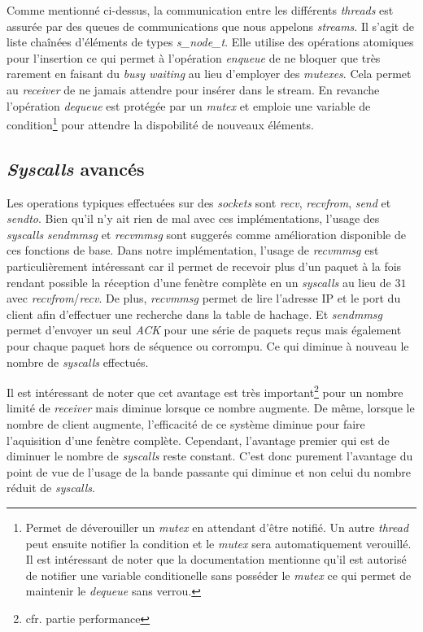 \documentclass[../main.tex]{subfiles}
\begin{document}
Comme mentionné ci-dessus, la communication entre les différents \textit{threads} est assurée par des queues de communications que nous appelons \textit{streams}.
Il s'agit de liste chaînées d'éléments de types \textit{s\_node\_t}. Elle utilise des opérations atomiques pour l'insertion ce qui permet
à l'opération \textit{enqueue} de ne bloquer que très rarement en faisant du \textit{busy waiting} au lieu d'employer des \textit{mutexes}. Cela permet
au \textit{receiver} de ne jamais attendre pour insérer dans le stream. En revanche l'opération \textit{dequeue} est protégée par un \textit{mutex} et
emploie une variable de condition\footnote{ Permet de déverouiller un \textit{mutex} en attendant d'être notifié. Un autre \textit{thread} peut ensuite notifier
la condition et le \textit{mutex} sera automatiquement verouillé. Il est intéressant de noter que la documentation mentionne qu'il est autorisé
de notifier une variable conditionelle sans posséder le \textit{mutex} ce qui permet de maintenir le \textit{dequeue} sans verrou. } pour attendre la dispobilité de nouveaux éléments.

\subsection{\textit{Syscalls} avancés}
\label{sec:syscalls}

Les operations typiques effectuées sur des \textit{sockets} sont \textit{recv}, \textit{recvfrom}, \textit{send} et \textit{sendto}. Bien qu'il n'y ait rien
de mal avec ces implémentations, l'usage des \textit{syscalls} \textit{sendmmsg} et \textit{recvmmsg} sont suggerés comme amélioration disponible\cite{that_awesome_paper}
de ces fonctions de base. Dans notre implémentation, l'usage de \textit{recvmmsg} est particulièrement intéressant car il permet de recevoir plus d'un paquet à la fois
rendant possible la réception d'une fenètre complète en un \textit{syscalls} au lieu de $31$ avec \textit{recvfrom}/\textit{recv}. De plus, \textit{recvmmsg} permet
de lire l'adresse IP et le port du client afin d'effectuer une recherche dans la table de hachage. Et \textit{sendmmsg} permet d'envoyer un seul \textit{ACK} pour
une série de paquets reçus mais également pour chaque paquet hors de séquence ou corrompu. Ce qui diminue à nouveau le nombre de \textit{syscalls} effectués.

Il est intéressant de noter que cet avantage est très important\footnote{ cfr. partie performance} pour un nombre limité de \textit{receiver} mais diminue lorsque 
ce nombre augmente. De même, lorsque le nombre de client augmente, l'efficacité de ce système diminue pour faire l'aquisition d'une fenètre complète. 
Cependant, l'avantage premier qui est de diminuer le nombre de \textit{syscalls} reste constant. C'est donc purement l'avantage du point de vue de 
l'usage de la bande passante qui diminue et non celui du nombre réduit de \textit{syscalls}.
\end{document}
